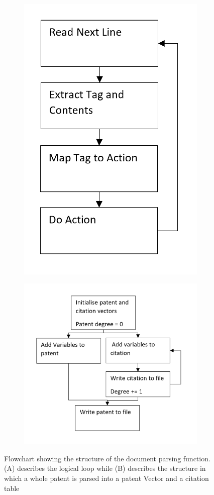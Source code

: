 \begin{figure}
\centering
\begin{subfigure}{.3\textwidth}
  \centering
  \includegraphics[width=0.7\linewidth]{Figures/FlowChartCoreLogic}
  \caption{}
\label{fig:FlowChartCoreLogic}
\end{subfigure}%
\begin{subfigure}{.7\textwidth}
  \centering
  \includegraphics[width=0.7\linewidth]{Figures/FlowChartParseStructure}
  \caption{}
\label{fig:FlowChartParseStructure}
\end{subfigure}
\caption[Flowchart: Parsing Function]{\footnotesize Flowchart showing the structure of the document parsing function. (A) describes the logical loop while (B) describes the structure in which a whole patent is parsed into a patent Vector and a citation table}
\label{fig:Structure of Parsing Algorithm}
\end{figure}

